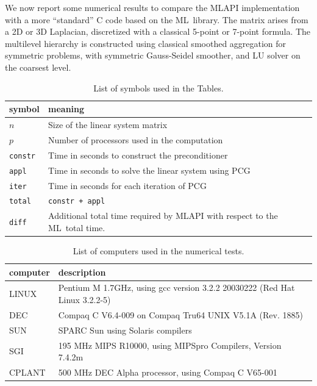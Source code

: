 \documentclass{article}[11pt]
\newcommand{\ML}     {{\sc ML}}
\newcommand{\mlapi}  {{\sc MLAPI }}
\begin{document}
We now report some numerical results to compare the \mlapi implementation with
a more ``standard'' C code based on the \ML\ library. The matrix arises from a 2D
or 3D Laplacian, discretized with a classical 5-point or 7-point formula.
The multilevel hierarchy is constructed using classical smoothed aggregation
for symmetric problems, with symmetric Gauss-Seidel smoother, and LU solver on
the coarsest level.

\begin{table}
\begin{center}
\begin{tabular}{| p{2cm}  p{10cm} |}
\hline
symbol & meaning \\
\hline
$n$          & Size of the linear system matrix \\
$p$          & Number of processors used in the computation \\
\tt constr   & Time in seconds to construct the preconditioner \\
\tt appl     & Time in seconds to solve the linear system using PCG\\
\tt iter     & Time in seconds for each iteration of PCG \\
\tt total    & \tt constr + appl \\
\tt diff     & Additional total time required by \mlapi with respect to the
\ML\ total time.\\
\hline
\end{tabular}
\caption{List of symbols used in the Tables.}
\label{tab:symbol}
\end{center}
\end{table}

\begin{table}
\begin{center}
\begin{tabular}{| p{2cm}  p{10cm} |}
\hline
computer & description \\
\hline
LINUX  & Pentium M 1.7GHz, using gcc version 3.2.2 20030222 (Red Hat Linux
                                                             3.2.2-5) \\
DEC    & Compaq C V6.4-009 on Compaq Tru64 UNIX V5.1A (Rev. 1885) \\
SUN    & SPARC Sun using Solaris compilers \\
SGI    & 195 MHz MIPS R10000, using MIPSpro Compilers, Version 7.4.2m \\
CPLANT & 500 MHz DEC Alpha processor, using Compaq C V65-001 \\
\hline
\end{tabular}
\caption{List of computers used in the numerical tests.}
\label{tab:machines}
\end{center}
\end{table}
\end{document}
